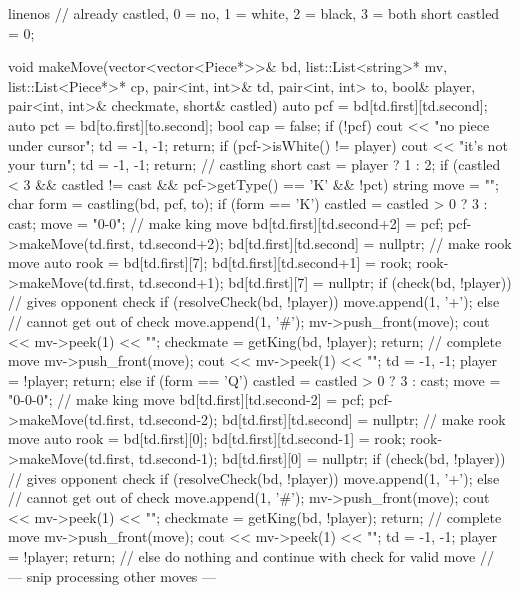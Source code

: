 \begin{cpp*}{linenos}
// already castled, 0 = no, 1 = white, 2 = black, 3 = both
short castled = 0;

void makeMove(vector<vector<Piece*>>& bd,
              list::List<string>* mv,
              list::List<Piece*>* cp,
              pair<int, int>& td,
              pair<int, int> to,
              bool& player,
              pair<int, int>& checkmate,
              short& castled)
{
  auto pcf = bd[td.first][td.second];
  auto pct = bd[to.first][to.second];
  bool cap = false;
  if (!pcf) {
    cout << "no piece under cursor\n";
    td = {-1, -1};
    return;
  }
  if (pcf->isWhite() != player) {
    cout << "it's not your turn\n";
    td = {-1, -1};
    return;
  }
  // castling
  short cast = player ? 1 : 2;
  if (castled < 3 && castled != cast && pcf->getType() == 'K' && !pct) {
    string move = "";
    char form = castling(bd, pcf, to);
    if (form == 'K') {
      castled = castled > 0 ? 3 : cast;
      move = "0-0";
      // make king move
      bd[td.first][td.second+2] = pcf;
      pcf->makeMove(td.first, td.second+2);
      bd[td.first][td.second] = nullptr;
      // make rook move
      auto rook = bd[td.first][7];
      bd[td.first][td.second+1] = rook;
      rook->makeMove(td.first, td.second+1);
      bd[td.first][7] = nullptr;
      if (check(bd, !player)) { // gives opponent check
        if (resolveCheck(bd, !player)) {
          move.append(1, '+');
        } else { // cannot get out of check
          move.append(1, '#');
          mv->push_front(move);
          cout << mv->peek(1) << "\n";
          checkmate = getKing(bd, !player);
          return;
        }
      }
      // complete move
      mv->push_front(move);
      cout << mv->peek(1) << "\n";
      td = {-1, -1};
      player = !player;
      return;
    } else if (form == 'Q') {
      castled = castled > 0 ? 3 : cast;
      move = "0-0-0";
      // make king move
      bd[td.first][td.second-2] = pcf;
      pcf->makeMove(td.first, td.second-2);
      bd[td.first][td.second] = nullptr;
      // make rook move
      auto rook = bd[td.first][0];
      bd[td.first][td.second-1] = rook;
      rook->makeMove(td.first, td.second-1);
      bd[td.first][0] = nullptr;
      if (check(bd, !player)) { // gives opponent check
        if (resolveCheck(bd, !player)) {
          move.append(1, '+');
        } else { // cannot get out of check
          move.append(1, '#');
          mv->push_front(move);
          cout << mv->peek(1) << "\n";
          checkmate = getKing(bd, !player);
          return;
        }
      }
      // complete move
      mv->push_front(move);
      cout << mv->peek(1) << "\n";
      td = {-1, -1};
      player = !player;
      return;
    } // else do nothing and continue with check for valid move
  }
  // --- snip processing other moves ---
}
\end{cpp*}

